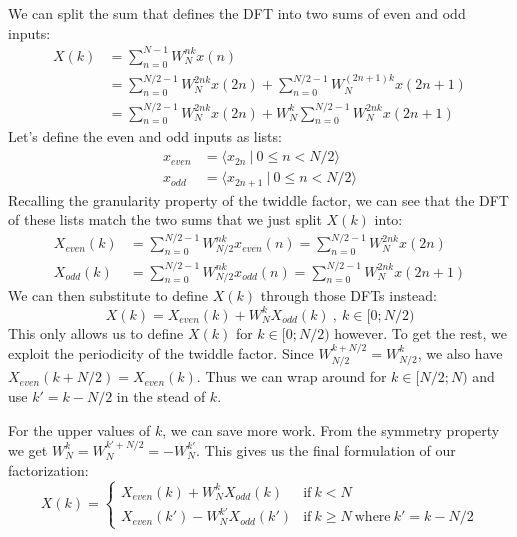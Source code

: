 We can split the sum that defines the DFT into two sums of even and odd inputs:
\begin{align}
    X(k) &= \sum_{n = 0}^{N - 1} W_N^{nk} x(n) \\
    &= \sum_{n = 0}^{N/2 - 1} W_N^{2nk} x(2n) + \sum_{n = 0}^{N/2 - 1} W_N^{(2n + 1)k} x(2n + 1) \\
    &= \sum_{n = 0}^{N/2 - 1} W_N^{2nk} x(2n) + W_N^k \sum_{n = 0}^{N/2 - 1} W_N^{2nk} x(2n + 1) %
\end{align}
Let's define the even and odd inputs as lists:
\begin{align}
    x_\textit{even} &= \langle x_{2n} ~|~ 0 \leq n < N/2 \rangle\\
    x_\textit{odd}  &= \langle x_{2n + 1} ~|~ 0 \leq n < N/2 \rangle
\end{align}
Recalling the granularity property of the twiddle factor,
we can see that the DFT of these lists match the two sums that we just split $X(k)$ into:
\begin{align}
    X_\textit{even}(k) &= \sum_{n = 0}^{N/2 - 1} W_{N/2}^{nk} x_\textit{even}(n) = \sum_{n = 0}^{N/2 - 1} W_{N}^{2nk} x(2n) \\
    X_\textit{odd}(k) &= \sum_{n = 0}^{N/2 - 1} W_{N/2}^{nk} x_\textit{odd}(n) = \sum_{n = 0}^{N/2 - 1} W_{N}^{2nk} x(2n + 1)
\end{align}
We can then substitute to define $X(k)$ through those DFTs instead:
\begin{equation}
    X(k) = X_\textit{even}(k) + W_N^k X_\textit{odd}(k) ~,~ k \in [0;N/2)
\end{equation}
This only allows us to define $X(k)$ for $k \in [0;N/2)$ however.
To get the rest, we exploit the periodicity of the twiddle factor.
Since $W_{N/2}^{k + N/2} = W_{N/2}^k$, we also have $X_\textit{even}(k + N/2) = X_\textit{even}(k)$.
Thus we can wrap around for $k \in [N/2;N)$ and use $k' = k - N/2$ in the stead of $k$.

For the upper values of $k$, we can save more work.
From the symmetry property we get $W_N^k = W_N^{k' + N/2} = -W_N^{k'}$.
This gives us the final formulation of our factorization:
\begin{equation}
    X(k) =
    \begin{cases}
        X_\textit{even}(k) + W_N^k X_\textit{odd}(k) &\text{if}~k < N \\
        X_\textit{even}(k') - W_N^{k'} X_\textit{odd}(k') &\text{if}~k \geq N ~\text{where}~k' = k - N/2
    \end{cases}
\end{equation}

